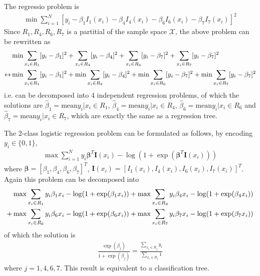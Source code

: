 \begin{exercise}
  The regressio problem is
  \begin{align}
    \min\sum_{i=1}^N \left[y_i - \beta_1I_1(x_i) - \beta_4I_4(x_i)  -
    \beta_6I_6(x_i) - \beta_7I_7(x_i)\right]^2
  \end{align}
  Since $R_1, R_4, R_6, R_7$ is a partitial of the sample space $\mathcal{X}$,
  the above problem can be rewritten as 
  \begin{align}
    & \min \sum_{x_i\in R_1}[y_i - \beta_1]^2 + \sum_{x_i\in R_4}[y_i -
    \beta_4]^2 + \sum_{x_i\in R_6}[y_i - \beta_7]^2 + \sum_{x_i\in
    R_7}[y_i - \beta_7]^2 \notag \\
    \leftrightarrow & \min \sum_{x_i\in R_1}[y_i - \beta_1]^2 + \min
    \sum_{x_i\in R_4}[y_i - \beta_4]^2 + \min \sum_{x_i\in R_6}[y_i - \beta_7]^2
    + \min \sum_{x_i\in R_7}[y_i - \beta_7]^2
  \end{align}
  i.e. can be decomposed into 4 independent regression problems, of which the
  solutions are $\hat{\beta}_1 = \mbox{mean}{y_i|x_i\in R_1}$, $\hat{\beta}_4 =
  \mbox{mean}{y_i|x_i\in R_4}$, $\hat{\beta}_6 = \mbox{mean}{y_i|x_i\in R_6}$
  and $\hat{\beta}_7 = \mbox{mean}{y_i|x_i\in R_7}$, which are exactly the same
  as a regression tree.
  
  The 2-class logistic regression problem can be formulated as follows, by
  encoding $y_i \in\{0, 1\}$,
  \begin{align}
    \max\sum_{i=1}^Ny_i\bm{\beta}^T\mathbf{I}(x_i) -
    \log(1+\exp(\bm{\beta}^T\mathbf{I}(x_i)))
  \end{align}
  where $\bm{\beta} = [\beta_1, \beta_4, \beta_6, \beta_7]^T$, $\mathbf{I}(x_i)
  = [I_1(x_i), I_4(x_i), I_6(x_i), I_7(x_i)]^T$. Again this problem can be
  decomposed into
  \begin{align}
    & \max \sum_{x_i\in R_1}y_i\beta_1x_i - \log(1+\exp(\beta_1x_i)) + 
    \max \sum_{x_i\in R_4}y_i\beta_4x_i - \log(1+\exp(\beta_4x_i)) \notag \\ + &
    \max \sum_{x_i\in R_6}y_i\beta_6x_i - \log(1+\exp(\beta_6x_i)) + 
    \max \sum_{x_i\in R_7}y_i\beta_7x_i - \log(1+\exp(\beta_7x_i))
  \end{align}
  of which the solution is
  \begin{align}
    \frac{\exp(\beta_j)}{1+\exp(\beta_j)} = \frac{\sum_{x_i\in R_j}
    y_i}{\sum_{x_i\in R_j} 1}
  \end{align}
  where $j = 1, 4, 6, 7$. This result is equivalent to a classification tree.
\end{exercise}